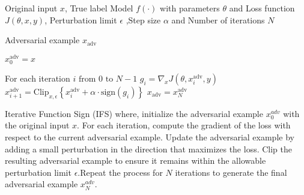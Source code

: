 Original input $x$, True label Model $f(\cdot)$ with parameters $\theta$
and Loss function $J(\theta, x, y)$, Perturbation limit $\epsilon$ ,Step size $\alpha$ and Number of iterations $N$

Adversarial example $x_{\text{adv}}$

$x_{0}^{\text{adv}} = x$

For each iteration $i \text{ from } 0 \text{ to } N-1$
$g_i = \nabla_x J(\theta, x_i^{\text{adv}}, y)$
$x_{i+1}^{\text{adv}} = \text{Clip}_{x, \epsilon}\left\{ x_i^{\text{adv}} + \alpha \cdot \text{sign}(g_i) \right\}$
$x_{\text{adv}} = x_N^{\text{adv}}$

Iterative Function Sign (IFS) where, initialize the adversarial example $x_0^{adv}$  with the original input $x$. For each iteration, compute the gradient of the loss with respect to the current adversarial example. Update the adversarial example by adding a small perturbation in the direction that maximizes the loss. Clip the resulting adversarial example to ensure it remains within the allowable perturbation limit $\epsilon$.Repeat the process for $N$ iterations to generate the final adversarial example $x_N^{adv}$.

